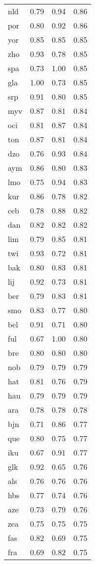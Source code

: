 \begin{table}
\begin{tabular}{lrrr}
nld & 0.79 & 0.94 & 0.86 \\
por & 0.80 & 0.92 & 0.86 \\
yor & 0.85 & 0.85 & 0.85 \\
zho & 0.93 & 0.78 & 0.85 \\
spa & 0.73 & 1.00 & 0.85 \\
gla & 1.00 & 0.73 & 0.85 \\
srp & 0.91 & 0.80 & 0.85 \\
myv & 0.87 & 0.81 & 0.84 \\
oci & 0.81 & 0.87 & 0.84 \\
ton & 0.87 & 0.81 & 0.84 \\
dzo & 0.76 & 0.93 & 0.84 \\
aym & 0.86 & 0.80 & 0.83 \\
lmo & 0.75 & 0.94 & 0.83 \\
kur & 0.86 & 0.78 & 0.82 \\
ceb & 0.78 & 0.88 & 0.82 \\
dan & 0.82 & 0.82 & 0.82 \\
lim & 0.79 & 0.85 & 0.81 \\
twi & 0.93 & 0.72 & 0.81 \\
bak & 0.80 & 0.83 & 0.81 \\
lij & 0.92 & 0.73 & 0.81 \\
ber & 0.79 & 0.83 & 0.81 \\
smo & 0.83 & 0.77 & 0.80 \\
bel & 0.91 & 0.71 & 0.80 \\
ful & 0.67 & 1.00 & 0.80 \\
bre & 0.80 & 0.80 & 0.80 \\
nob & 0.79 & 0.79 & 0.79 \\
hat & 0.81 & 0.76 & 0.79 \\
hau & 0.79 & 0.79 & 0.79 \\
ara & 0.78 & 0.78 & 0.78 \\
bjn & 0.71 & 0.86 & 0.77 \\
que & 0.80 & 0.75 & 0.77 \\
iku & 0.67 & 0.91 & 0.77 \\
glk & 0.92 & 0.65 & 0.76 \\
als & 0.76 & 0.76 & 0.76 \\
hbs & 0.77 & 0.74 & 0.76 \\
aze & 0.73 & 0.79 & 0.76 \\
zea & 0.75 & 0.75 & 0.75 \\
fas & 0.82 & 0.69 & 0.75 \\
fra & 0.69 & 0.82 & 0.75 \\

\end{tabular}
\end{table}
